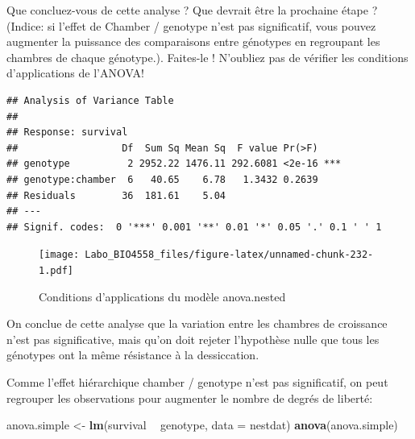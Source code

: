 \documentclass[12pt,]{book}
\newenvironment{Shaded}{\begin{snugshade}}{\end{snugshade}}
\newcommand{\DataTypeTok}[1]{\textcolor[rgb]{0.13,0.29,0.53}{#1}}
\newcommand{\KeywordTok}[1]{\textcolor[rgb]{0.13,0.29,0.53}{\textbf{#1}}}
\newcommand{\NormalTok}[1]{#1}
\newcommand{\OperatorTok}[1]{\textcolor[rgb]{0.81,0.36,0.00}{\textbf{#1}}}
\newcommand{\StringTok}[1]{\textcolor[rgb]{0.31,0.60,0.02}{#1}}
\begin{document}
\begin{Shaded}
\end{Shaded}

Que concluez-vous de cette analyse ? Que devrait être la prochaine étape ? (Indice: si l'effet de Chamber / genotype n'est pas significatif, vous pouvez augmenter la puissance des comparaisons entre génotypes en regroupant les chambres de chaque génotype.). Faites-le ! N'oubliez pas de vérifier les conditions d'applications de l'ANOVA!

\begin{verbatim}
## Analysis of Variance Table
## 
## Response: survival
##                  Df  Sum Sq Mean Sq  F value Pr(>F)    
## genotype          2 2952.22 1476.11 292.6081 <2e-16 ***
## genotype:chamber  6   40.65    6.78   1.3432 0.2639    
## Residuals        36  181.61    5.04                    
## ---
## Signif. codes:  0 '***' 0.001 '**' 0.01 '*' 0.05 '.' 0.1 ' ' 1
\end{verbatim}

\begin{figure}
\centering
\texttt{[image: Labo\_BIO4558\_files/figure-latex/unnamed-chunk-232-1.pdf]}
\caption{\label{fig:unnamed-chunk-232}Conditions d'applications du modèle anova.nested}
\end{figure}

On conclue de cette analyse que la variation entre les chambres de croissance n'est pas significative, mais qu'on doit rejeter l'hypothèse nulle que tous les génotypes ont la même résistance à la dessiccation.

Comme l'effet hiérarchique chamber / genotype n'est pas significatif, on peut regrouper les observations pour augmenter le nombre de degrés de liberté:

\begin{Shaded}
\begin{Highlighting}[]
\NormalTok{anova.simple <-}\StringTok{ }\KeywordTok{lm}\NormalTok{(survival }\OperatorTok{~}\StringTok{ }\NormalTok{genotype, }\DataTypeTok{data =}\NormalTok{ nestdat)}
\KeywordTok{anova}\NormalTok{(anova.simple)}
\end{Highlighting}
\end{Shaded}
\end{document}
